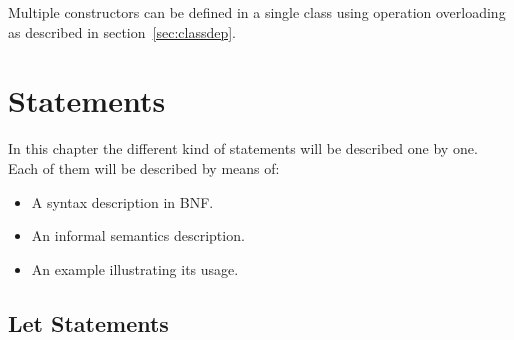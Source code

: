 \documentclass{overturerepchap}
\begin{document}
Multiple constructors can be defined in a single class using
operation overloading as described in section~\ref{sec:classdep}. 


\chapter{Statements}\label{sec:stmt}

In this chapter the different kind of statements will be described
one by one. Each of them will be described by means of:
\begin{itemize}
\item A syntax description in BNF.
\item An informal semantics description.
\item An example illustrating its usage.
\end{itemize}

\section{Let Statements}\label{letstmt}
\end{document}
